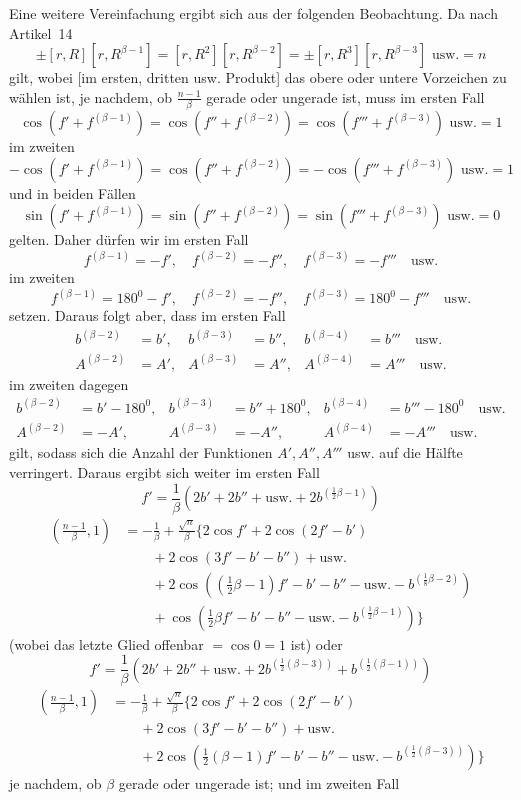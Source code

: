 \clearpage
{}
Eine weitere Vereinfachung ergibt sich aus der folgenden Beobachtung. Da nach Artikel~14
\[
\pm[r,R][r,R^{\beta-1}]=[r,R^2][r,R^{\beta-2}]=\pm[r,R^3][r,R^{\beta-3}]\text{ usw.}=n
\]
gilt, wobei [im ersten, dritten usw. Produkt] das obere oder untere Vorzeichen zu wählen ist, je nachdem, ob $\frac{n-1}\beta$ gerade oder ungerade ist, muss im ersten Fall
\[
\cos(f'+f^{(\beta-1)})=\cos(f''+f^{(\beta-2)})=\cos(f'''+f^{(\beta-3)})\text{ usw.}=1
\]
im zweiten
\[
-\cos(f'+f^{(\beta-1)})=\cos(f''+f^{(\beta-2)})=-\cos(f'''+f^{(\beta-3)})\text{ usw.}=1
\]
und in beiden Fällen
\[
\sin(f'+f^{(\beta-1)})=\sin(f''+f^{(\beta-2)})=\sin(f'''+f^{(\beta-3)})\text{ usw.}=0
\]
gelten. Daher dürfen wir im ersten Fall
\[
f^{(\beta-1)}=-f',\quad f^{(\beta-2)}=-f'',\quad f^{(\beta-3)}=-f'''\quad\text{usw.}
\]
im zweiten
\[
f^{(\beta-1)}=180^0-f',\quad f^{(\beta-2)}=-f'',\quad f^{(\beta-3)}=180^0-f'''\quad\text{usw.}
\]
setzen. Daraus folgt aber, dass im ersten Fall
\[
\begin{aligned}
b^{(\beta-2)}&=b',&b^{(\beta-3)}&=b'',&b^{(\beta-4)}&=b'''\quad\text{usw.}\\
A^{(\beta-2)}&=A',&A^{(\beta-3)}&=A'',&A^{(\beta-4)}&=A'''\quad\text{usw.}
\end{aligned}
\]
im zweiten dagegen
\[
\begin{aligned}
b^{(\beta-2)}&=b'-180^0,&b^{(\beta-3)}&=b''+180^0,&b^{(\beta-4)}&=b'''-180^0\quad\text{usw.}\\
A^{(\beta-2)}&=-A',&A^{(\beta-3)}&=-A'',&A^{(\beta-4)}&=-A'''\quad\text{usw.}
\end{aligned}
\]
gilt, sodass sich die Anzahl der Funktionen $A',A'',A'''$ usw. auf die Hälfte verringert. Daraus ergibt sich weiter im ersten Fall
\begingroup{}
\[
f'=\frac1\beta(2b'+2b''+\text{usw.}+2b^{(\frac12\beta-1)})
\]
\endgroup
\begingroup{}
\[
\begin{aligned}
\left(\frac{n-1}\beta,1\right)&=-\frac1\beta+\frac{\surd n}\beta\{2\cos f'+2\cos(2f'-b')\\
&\qquad+2\cos(3f'-b'-b'')+\text{usw.}\\
&\qquad+2\cos((\tfrac12\beta-1)f'-b'-b''-\text{usw.}-b^{(\frac18\beta-2)})\\
&\qquad+\cos(\tfrac12\beta f'-b'-b''-\text{usw.}-b^{(\frac12\beta-1)})\}
\end{aligned}
\]
\endgroup
(wobei das letzte Glied offenbar $=\cos0=1$ ist) oder
\begingroup{}
\[
f'=\frac1\beta(2b'+2b''+\text{usw.}+2b^{(\frac12(\beta-3))}+b^{(\frac12(\beta-1))})
\]
\endgroup
\[
\begin{aligned}
\left(\frac{n-1}\beta,1\right)&=-\frac1\beta+\frac{\surd n}\beta\{2\cos f'+2\cos(2f'-b')\\
&\qquad+2\cos(3f'-b'-b'')+\text{usw.}\\
&\qquad+2\cos(\tfrac12(\beta-1)f'-b'-b''-\text{usw.}-b^{(\frac12(\beta-3))})\}
\end{aligned}
\]
je nachdem, ob $\beta$ gerade oder ungerade ist; und im zweiten Fall

